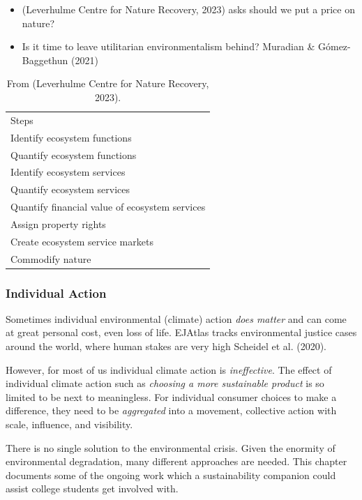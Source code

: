 \documentclass[
  letterpaper,
  DIV=11,
  numbers=noendperiod]{scrartcl}
\providecommand{\tightlist}{%
  \setlength{\itemsep}{0pt}\setlength{\parskip}{0pt}}\usepackage{longtable,booktabs,array}
\begin{document}
\begin{itemize}
\tightlist
\item
  (Leverhulme Centre for Nature Recovery, 2023) asks should we put a
  price on nature?
\item
  Is it time to leave utilitarian environmentalism behind? Muradian \&
  Gómez-Baggethun (2021)
\end{itemize}

\begin{longtable}[]{@{}l@{}}
\caption{From (Leverhulme Centre for Nature Recovery,
2023).}\tabularnewline
\toprule\noalign{}
\endfirsthead
\endhead
\bottomrule\noalign{}
\endlastfoot
9 Steps \\
Identify ecosystem functions \\
Quantify ecosystem functions \\
Identify ecosystem services \\
Quantify ecosystem services \\
Quantify financial value of ecosystem services \\
Assign property rights \\
Create ecosystem service markets \\
Commodify nature \\
\end{longtable}

\subsubsection{Individual Action}\label{individual-action}

Sometimes individual environmental (climate) action \emph{does matter}
and can come at great personal cost, even loss of life. EJAtlas tracks
environmental justice cases around the world, where human stakes are
very high Scheidel et al. (2020).

However, for most of us individual climate action is \emph{ineffective}.
The effect of individual climate action such as \emph{choosing a more
sustainable product} is so limited to be next to meaningless. For
individual consumer choices to make a difference, they need to be
\emph{aggregated} into a movement, collective action with scale,
influence, and visibility.

There is no single solution to the environmental crisis. Given the
enormity of environmental degradation, many different approaches are
needed. This chapter documents some of the ongoing work which a
sustainability companion could assist college students get involved
with.
\end{document}
